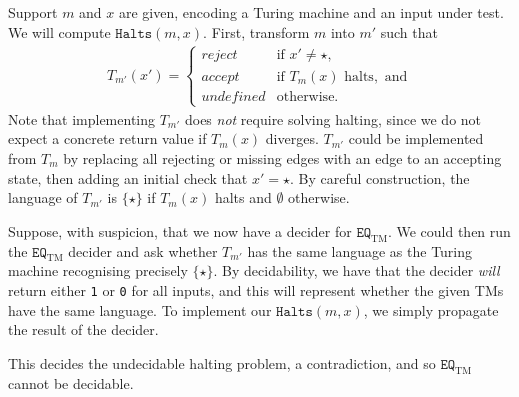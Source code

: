 \documentclass[a4paper]{article}
\begin{document}
Support $m$ and $x$ are given, encoding a Turing machine and an input under test.
We will compute $\texttt{Halts}(m, x)$.
First, transform $m$ into $m'$ such that
\begin{align*}
  T_{m'}(x') = \begin{cases}
    \textit{reject} &\text{if }x' \ne \text{$\star$}, \\
    \textit{accept} &\text{if }T_m(x)\text{ halts},\text{ and}\\
    \textit{undefined} & \text{otherwise}.
  \end{cases}
\end{align*}
Note that implementing $T_{m'}$ does \textit{not} require solving halting,
since we do not expect a concrete return value if $T_m(x)$ diverges.
$T_{m'}$ could be implemented from $T_m$ by %
replacing all rejecting or missing edges
with an edge to an accepting state, 
then adding an initial check that $x' = \text{$\star$}$.
By careful construction,
the language of $T_{m'}$ is $\{\text{$\star$}\}$ if $T_m(x)$
halts and $\emptyset$ otherwise.





Suppose, with suspicion, that we now have a decider for $\texttt{EQ}_{\text{TM}}$.
We could then run the 
$\texttt{EQ}_{\text{TM}}$
decider and ask whether
$T_{m'}$ has the same language as the Turing machine recognising precisely $\{\star\}$.
By decidability, we have that the decider \textit{will} return either \texttt 1 or \texttt 0
for all inputs,
and this will represent whether the given TMs have the same language.
To implement our
$\texttt{Halts}(m, x)$,
we simply propagate the result of the decider.

This decides the undecidable halting problem, a contradiction, and so $\texttt{EQ}_{\text{TM}}$
cannot be decidable.



\end{document}

